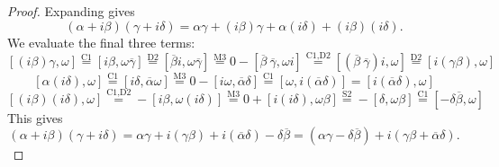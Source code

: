 \documentclass[10pt]{amsart}
\renewcommand{\bar}{\overline}
\newcommand{\norm}[1]{\left[#1\right]}
\begin{document}
\begin{enumerate}
\begin{proof}
Expanding gives
$$
(\alpha + i\beta)(\gamma + i\delta) = \alpha \gamma + (i\beta)\gamma + \alpha(i\delta) + (i\beta)(i\delta).
$$
We evaluate the final three terms:
$$
\norm{(i\beta)\gamma,\omega} \overset{\text{C}1}{=}
\norm{i\beta, \omega \bar{\gamma}}
\overset{\text{D}2}{=}
\norm{\bar{\beta}i,\omega \bar{\gamma}}
\overset{\text{M}3}{=}
0 - \norm{\bar{\beta}\ \bar{\gamma},\omega i}
\overset{\text{C1,D2}}{=}
\norm{(\bar{\beta} \ \bar{\gamma})i,\omega}
\overset{\text{D}2}{=}
\norm{i(\gamma \beta),\omega}
$$
$$
\norm{\alpha(i\delta),\omega}
\overset{\text{C}1}{=}
\norm{i\delta,\bar{\alpha}\omega}
\overset{\text{M}3}{=}
0 - \norm{i\omega,\bar{\alpha}\delta}
\overset{\text{C}1}{=}
\norm{\omega,i(\bar{\alpha}\delta)}
=
\norm{i(\bar{\alpha}\delta),\omega}
$$
$$
\norm{(i\beta)(i\delta),\omega}
\overset{\text{C1,D2}}{=}
-\norm{i\beta,\omega(i\delta)}
\overset{\text{M}3}{=}
0 + \norm{i(i\delta),\omega\beta}
\overset{\text{S2}}{=}
-\norm{\delta,\omega\beta}
\overset{\text{C}1}{=}
\norm{-\delta\bar{\beta},\omega}
$$
This gives
$$
(\alpha + i\beta)(\gamma + i\delta) = \alpha \gamma + i(\gamma\beta) + i(\bar{\alpha}\delta) - \delta \bar{\beta} = (\alpha\gamma - \delta \bar{\beta}) + i(\gamma\beta + \bar{\alpha}\delta).
$$
\end{proof}

\end{enumerate}
\end{document}
